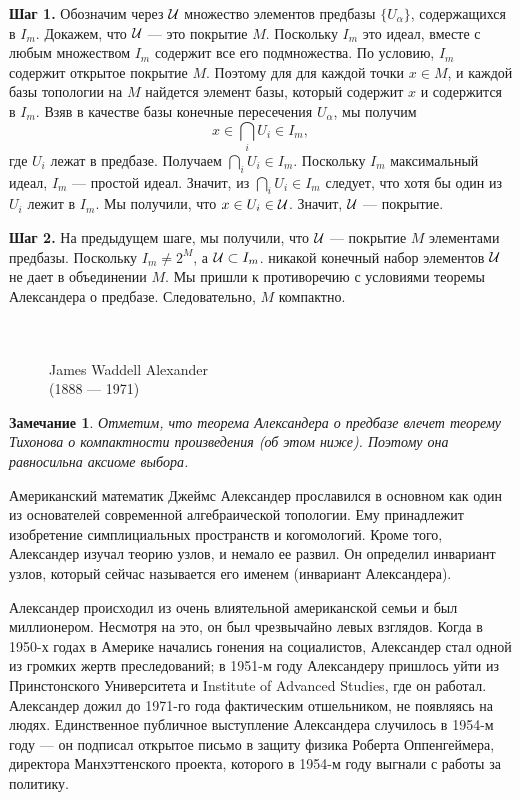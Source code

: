 \documentclass[12pt]{book}
\def\endproof{\hbox{\vrule width 5pt height 5pt depth 0pt}}
\theoremstyle{upshape}
\newtheorem{zadacha}{Задача}[chapter]
\theoremstyle{generic}
\newtheorem{remark}[teorema]{Замечание}
\def\замечание{\begin{remark}}
\def\еза{\end{remark}}
\theoremstyle{upshapenonumber}
\newcommand{\следствие}{%
     \refstepcounter{teorema}
     {\noindent\bf Следствие \thechapter.\arabic{teorema}:\ }}
\newcommand{\пример}{%
     \refstepcounter{teorema}
     {\noindent\bf Пример \thechapter.\arabic{teorema}:\ }}
\newcommand{\лемма}{%
     \refstepcounter{teorema}
     {\noindent\bf Лемма \thechapter.\arabic{teorema}:\ }}
\newcommand{\теорема}{%
     \refstepcounter{teorema}
     {\noindent\bf Теорема \thechapter.\arabic{teorema}:\ }}
\newcommand{\утверждение}{%
     \refstepcounter{teorema}
     {\noindent\bf Утверждение \thechapter.\arabic{teorema}:\ }}
\def\хфилл{\hfill}
\def\ноиндент{\noindent}
\def\бф{\bf}
\def\ем{\em}
\def\задача{\begin{zadacha}}
\def\ез{\end{zadacha}}
\def\еу{\end{ukazanie}}
\def\ео{\end{opredelenie}}
\def\енум{\begin{enumerate}}
\def\ее{\end{enumerate}}
\begin{document}
\ноиндент 
{\бф Шаг 1.} 
Обозначим через ${\cal U}$ множество элементов 
предбазы $\{U_\alpha\}$, содержащихся в $I_m$.
Докажем, что ${\cal U}$ --- это покрытие $M$.
Поскольку $I_m$ это идеал, вместе с любым
 множеством $I_m$ содержит все
его подмножества. По условию,
$I_m$ содержит открытое покрытие $M$.
Поэтому для  для каждой точки $x\in M$, и каждой базы
топологии на $M$ найдется элемент базы,
который содержит $x$ и содержится в  $I_m$.
Взяв в качестве базы конечные
пересечения $U_\alpha$, мы получим
\[
x \in \bigcap_i U_i \in I_m,
\]
где $U_i$ лежат в предбазе.
Получаем $\bigcap_i U_i\in I_m$.
Поскольку $I_m$ максимальный идеал, 
$I_m$ --- простой идеал. Значит,
из $\bigcap_i U_i\in I_m$  следует,
что хотя бы один из $U_i$ лежит в $I_m$.
Мы получили, что $x\in U_i \in {\cal U}$.
Значит, ${\cal U}$ --- покрытие.


\хфилл

\ноиндент 
{\бф Шаг 2.}
На предыдущем шаге,
мы получили, что ${\cal U}$ --- 
покрытие $M$ элементами предбазы.
Поскольку $I_m\neq 2^M$, а ${\cal U}\subset I_m$.
никакой конечный набор элементов
${\cal U}$ не дает в объединении $M$.
Мы пришли к противоречию с условиями теоремы
Александера о предбазе. Следовательно, $M$ компактно.
\endproof



\begin{figure}[ht]
\begin{center}\ \\
\\
{James Waddell Alexander\\
(1888 --- 1971)}
\end{center}
\end{figure}

\замечание
Отметим, что теорема Александера о предбазе влечет
теорему Тихонова о компактности произведения
(об этом ниже). Поэтому она равносильна аксиоме выбора.
\еза


Американский математик Джеймс Александер прославился
в основном как один из основателей современной алгебраической
топологии. Ему принадлежит изобретение симплициальных пространств
и когомологий. Кроме того, Александер изучал
теорию узлов, и немало ее развил. Он 
определил инвариант узлов, который сейчас
называется его именем (инвариант Александера).

Александер происходил из очень влиятельной
американской семьи и был миллионером. Несмотря 
на это, он был чрезвычайно левых взглядов. Когда 
в 1950-х годах в Америке начались гонения на социалистов,
Александер стал одной из громких жертв преследований; в 1951-м году
Александеру пришлось уйти из Принстонского Университета
и Institute of Advanced Studies, где он работал.
Александер дожил до 1971-го года фактическим
отшельником, не появляясь на людях. Единственное
публичное выступление Александера случилось в 1954-м году --- 
он подписал открытое письмо в защиту физика Роберта
Оппенгеймера, директора Манхэттенского проекта,
которого в 1954-м году выгнали с работы за 
политику.
\end{document}
